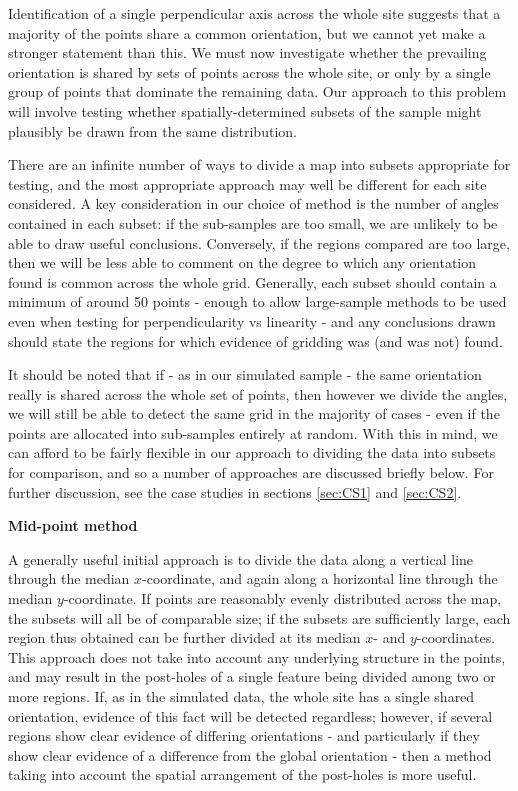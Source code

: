 \documentclass[../../ArchStats.tex]{subfiles}
\begin{document}
Identification of a single perpendicular axis across the whole site suggests that a majority of the points share a common orientation, but we cannot yet make a stronger statement than this. We must now investigate whether the prevailing orientation is shared by sets of points across the whole site, or only by a single group of points that dominate the remaining data. Our approach to this problem will involve testing whether spatially-determined subsets of the sample might plausibly be drawn from the same distribution.

There are an infinite number of ways to divide a map into subsets appropriate for testing, and the most appropriate approach may well be different for each site considered. A key consideration in our choice of method is the number of angles contained in each subset: if the sub-samples are too small, we are unlikely to be able to draw useful conclusions. Conversely, if the regions compared are too large, then we will be less able to comment on the degree to which any orientation found is common across the whole grid. Generally, each subset should contain a minimum of around 50 points - enough to allow large-sample methods to be used even when testing for perpendicularity vs linearity - and any conclusions drawn should state the regions for which evidence of gridding was (and was not) found.

It should be noted that if - as in our simulated sample - the same orientation really is shared across the whole set of points, then however we divide the angles, we will still be able to detect the same grid in the majority of cases - even if the points are allocated into sub-samples entirely at random. With this in mind, we can afford to be fairly flexible in our approach to dividing the data into subsets for comparison, and so a number of approaches are discussed briefly below. For further discussion, see the case studies in sections \ref{sec:CS1} and \ref{sec:CS2}.

\textbf{Mid-point method}

A generally useful initial approach is to divide the data along a vertical line through the median $x$-coordinate, and again along a horizontal line through the median $y$-coordinate. If points are reasonably evenly distributed across the map, the subsets will all be of comparable size; if the subsets are sufficiently large, each region thus obtained can be further divided at its median $x$- and $y$-coordinates. This approach does not take into account any underlying structure in the points, and may result in the post-holes of a single feature being divided among two or more regions. If, as in the simulated data, the whole site has a single shared orientation, evidence of this fact will be detected regardless; however, if several regions show clear evidence of differing orientations - and particularly if they show clear evidence of a difference from the global orientation - then a method taking into account the spatial arrangement of the post-holes is more useful.
\end{document}
